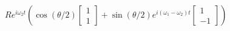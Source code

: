 \documentclass[preview]{standalone}
\begin{document}
\begin{center}
$R e^{i \omega_2 t}\left(\cos(\theta/2) \begin{bmatrix} 1 \\ 1\end{bmatrix} + \sin(\theta/2) e^{i (\omega_1-\omega_2) t}\begin{bmatrix} 1 \\ -1\end{bmatrix}\right)$
\end{center}
\end{document}
